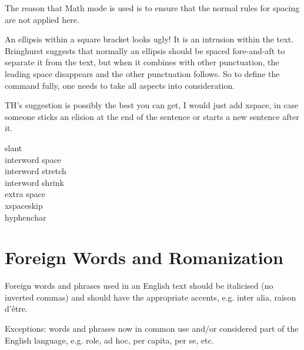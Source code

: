 The reason that Math mode is used is to ensure that the normal rules for spacing are not applied here.

An ellipsis within a square bracket looks ugly! It is an intrusion within the text. Bringhurst suggests that normally an ellipsis should be spaced fore-and-aft to separate it from the text, but when it combines with other punctuation, the leading space disappears and the other punctuation follows. So to define the command fully, one needs to take all aspects into consideration.

TH's suggestion is possibly the best you can get, I would just add xspace, in case someone sticks an elision at the end of the sentence or starts a new sentence  after it.

\begin{teX}
 \newcommand*\elide{\textup{[\,\dots]\xspace}
\end{teX}

\begin{description}
  \item[slant] \the{}\font
  \item[interword space] \the{}\font
  \item[interword stretch] \the{}\font
  \item[interword shrink] \the{}\font
  \item[extra space] \the{}\font
  \item[xspaceskip] \the\xspaceskip
  \item[hyphenchar] \the\hyphenchar\font
\end{description}

\section{Foreign Words and Romanization}

Foreign words and phrases used in an English text should be italicised (no
inverted commas) and should have the appropriate accents, e.g. inter alia,
raison d’être.

Exceptions: words and phrases now in common use and/or considered part of
the English language, e.g. role, ad hoc, per capita, per se, etc.

